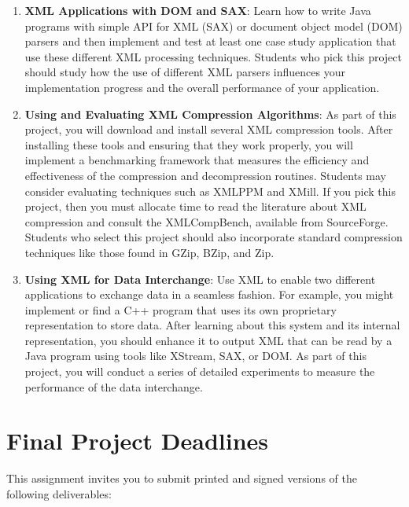 \begin{enumerate}
  \item {\bf XML Applications with DOM and SAX}: Learn how to write Java programs with simple API for XML (SAX) or
    document object model (DOM) parsers and then implement and test at least one case study application that use these
    different XML processing techniques.  Students who pick this project should study how the use of different XML
    parsers influences your implementation progress and the overall performance of your application.  

  \item {\bf Using and Evaluating XML Compression Algorithms}: As part of this project, you will download and install
    several XML compression tools.  After installing these tools and ensuring that they work properly, you will
    implement a benchmarking framework that measures the efficiency and effectiveness of the compression and
    decompression routines.  Students may consider evaluating techniques such as XMLPPM and XMill. If you pick this
    project, then you must allocate time to read the literature about XML compression and consult the XMLCompBench,
    available from SourceForge.  Students who select this project should also incorporate standard compression
    techniques like those found in GZip, BZip, and Zip.

  \item {\bf Using XML for Data Interchange}: Use XML to enable two different applications to exchange data in a
    seamless fashion.  For example, you might implement or find a C++ program that uses its own proprietary
    representation to store data.  After learning about this system and its internal representation, you should enhance
    it to output XML that can be read by a Java program using tools like XStream, SAX, or DOM.  As part of this project,
    you will conduct a series of detailed experiments to measure the performance of the data interchange.  
    
\end{enumerate} 

\section*{Final Project Deadlines}

This assignment invites you to submit printed and signed versions of the following deliverables: 

